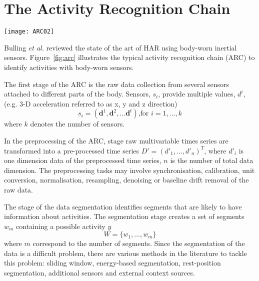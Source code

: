 \documentclass[10pt,journal,compsoc]{IEEEtran}
\begin{document}
% 

\section{The Activity Recognition Chain}

\begin{figure*}
\centering    
 \texttt{[image: ARC02]}
\caption[PA]{Typical activity recognition chain (ARC) to identify activities or gestures
from body-worn inertial sensors. 
Diagram is replicated from the work of Bulling \emph{et al.} \cite{bulling2014}.}
\label{fig:arc}
\end{figure*}

Bulling \emph{et al.} \cite{bulling2014} reviewed the state of the art of
HAR using body-worn inertial sensors.
Figure~\ref{fig:arc} illustrates the typical activity recognition chain (ARC) to identify
activities with body-worn sensors. 

The first stage of the ARC is the raw data collection from several sensors attached to 
different parts of the body. Sensors, $s_i$, provide multiple values, $d^i$, 
(e.g. 3-D acceleration referred to as x, y and z direction)
\begin{equation}
s_i = (\textbf{d}^1, \textbf{d}^2,\dots \textbf{d}^t) \mbox{,for } i=1, \dots,k
\end{equation} 
where $k$ denotes the number of sensors. 

In the preprocessing of the ARC, stage raw multivariable times series are transformed into a 
pre-processed time series $D'= (d'_1, \dots, d'_n )^T$, where $d'_i$ is one dimension data 
of the preprocessed time series, $n$ is the number of total data dimension.
The preprocessing tasks may involve synchronisation, calibration, unit conversion, 
normalisation, resampling, denoising or baseline drift removal of the raw data.

The stage of the data segmentation identifies segments 
that are likely to have information about activities.
The segmentation stage creates a set of segments $w_m$ containing a possible activity $y$
\begin{equation}
W = \{   w_1, \dots, w_m  \}
\end{equation} 
where $m$ correspond to the number of segments.
Since the segmentation of the data is a difficult problem, 
there are various methods in the literature to tackle this problem:
sliding window, energy-based segmentation, rest-position segmentation, 
additional sensors and external context sources.
\end{document}
